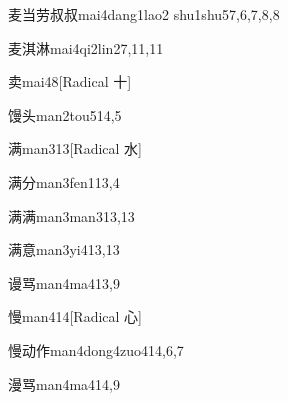 \begin{verbete}{麦当劳叔叔}{mai4dang1lao2 shu1shu5}{7,6,7,8,8}
\end{verbete}

\begin{verbete}{麦淇淋}{mai4qi2lin2}{7,11,11}
\end{verbete}

\begin{verbete}{卖}{mai4}{8}[Radical 十]
\end{verbete}

\begin{verbete}{馒头}{man2tou5}{14,5}
\end{verbete}

\begin{verbete}{满}{man3}{13}[Radical 水]
\end{verbete}

\begin{verbete}{满分}{man3fen1}{13,4}
\end{verbete}

\begin{verbete}{满满}{man3man3}{13,13}
\end{verbete}

\begin{verbete}{满意}{man3yi4}{13,13}
\end{verbete}

\begin{verbete}{谩骂}{man4ma4}{13,9}
\end{verbete}

\begin{verbete}{慢}{man4}{14}[Radical 心]
\end{verbete}

\begin{verbete}{慢动作}{man4dong4zuo4}{14,6,7}
\end{verbete}

\begin{verbete}{漫骂}{man4ma4}{14,9}
\end{verbete}

